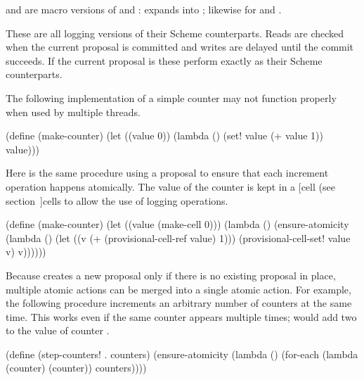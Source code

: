  and  are macro versions of
 and :
 expands into
; likewise for
 and .

\begin{protos}
\end{protos}
\noindent
These are all logging versions of their Scheme counterparts.
Reads are checked when the current proposal is committed and writes are
 delayed until the commit succeeds.
If the current proposal is  these perform exactly as their Scheme
 counterparts.

The following implementation of a simple counter may not function properly
 when used by multiple threads.
\begin{example}
(define (make-counter)
  (let ((value 0))
    (lambda ()
      (set! value (+ value 1))
      value)))
\end{example}

Here is the same procedure using a proposal to ensure that each
 increment operation happens atomically.
The value of the counter is kept in a
 [cell (see section~\Ref]{cells}
 to allow the use of
 logging operations.
\begin{example}
(define (make-counter)
  (let ((value (make-cell 0)))
    (lambda ()
      (ensure-atomicity
        (lambda ()
          (let ((v (+ (provisional-cell-ref value)
                      1)))
            (provisional-cell-set! value v)
            v))))))
\end{example}

Because  creates a new proposal only if there is
 no existing proposal in place, multiple atomic actions can be merged
 into a single atomic action.
For example, the following procedure increments an arbitrary number of
 counters at the same time.
This works even if the same counter appears multiple times;
  would add two to the value of counter .
\begin{example}
(define (step-counters! . counters)
  (ensure-atomicity
    (lambda ()
      (for-each (lambda (counter)
                  (counter))
                counters))))
\end{example}

